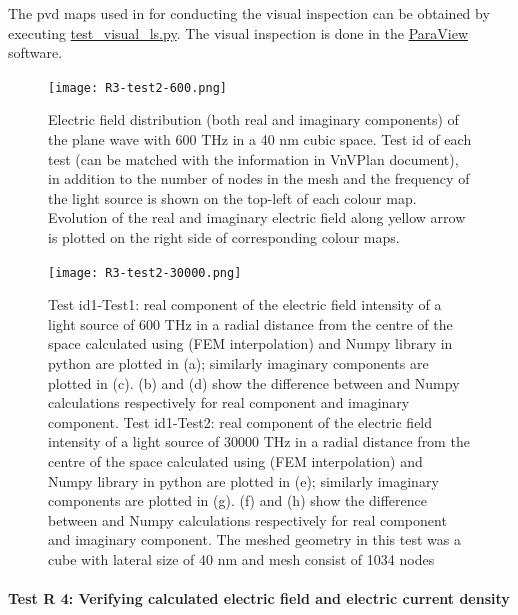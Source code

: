\documentclass[12pt, titlepage]{article}
\begin{document}
\begin{enumerate}
	The pvd maps used in for conducting the visual inspection can be obtained by executing \href{https://github.com/shmouses/SPDFM/tree/master/src/test_visual_ls.py}{test\_visual\_ls.py}. The visual inspection is done in the \href{www.paraview.org}{ParaView} software.
	
	\begin{figure} \centering \texttt{[image: R3-test2-600.png]}
		\caption{Electric field distribution (both real and imaginary components) of the plane wave with 600 THz in a 40 nm cubic space. Test id of each test (can be matched with the information in VnVPlan document), in addition to the number of nodes in the mesh and the frequency of the light source is shown on the top-left of each colour map. Evolution of the real and imaginary electric field along yellow arrow is plotted on the right side of corresponding colour maps.} \label{R3-test2-600}  
	\end{figure}
	
	\begin{figure} \centering \texttt{[image: R3-test2-30000.png]}
		\caption{Test id1-Test1: real component of the electric field intensity of a light source of 600 THz in a radial distance from the centre of the space calculated using \progname{} (FEM interpolation) and Numpy library in python are plotted in (a); similarly imaginary components are plotted in (c). (b) and (d) show the difference between \progname{} and Numpy calculations respectively for real component and imaginary component. Test id1-Test2: real component of the electric field intensity of a light source of 30000 THz in a radial distance from the centre of the space calculated using \progname{} (FEM interpolation) and Numpy library in python are plotted in (e); similarly imaginary components are plotted in (g). (f) and (h) show the difference between \progname{} and Numpy calculations respectively for real component and imaginary component. The meshed geometry in this test was a cube with lateral size of 40 nm and mesh consist of 1034 nodes} \label{R3-test2-30000} 
	\end{figure}	

	
\end{enumerate}

\paragraph{Test R 4: Verifying calculated electric field and electric current density}
\end{document}
